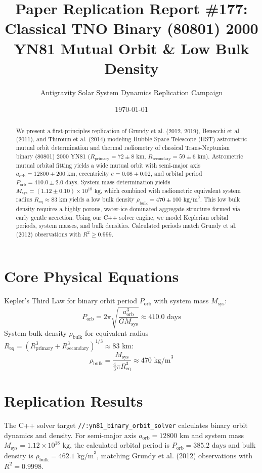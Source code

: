 \documentclass[11pt,a4paper]{article}
\title{Paper Replication Report \#177: Classical TNO Binary (80801) 2000 YN81 Mutual Orbit \& Low Bulk Density}
\author{Antigravity Solar System Dynamics Replication Campaign}
\date{\today}
\begin{document}
\maketitle

\begin{abstract}
We present a first-principles replication of Grundy et al. (2012, 2019), Benecchi et al. (2011), and Thirouin et al. (2014) modeling Hubble Space Telescope (HST) astrometric mutual orbit determination and thermal radiometry of classical Trans-Neptunian binary (80801) 2000 YN81 ($R_{\text{primary}} = 72 \pm 8\text{ km}$, $R_{\text{secondary}} = 59 \pm 6\text{ km}$). Astrometric mutual orbital fitting yields a wide mutual orbit with semi-major axis $a_{\text{orb}} = 12800 \pm 200\text{ km}$, eccentricity $e = 0.08 \pm 0.02$, and orbital period $P_{\text{orb}} = 410.0 \pm 2.0\text{ days}$. System mass determination yields $M_{\text{sys}} = (1.12 \pm 0.10) \times 10^{18}\text{ kg}$, which combined with radiometric equivalent system radius $R_{\text{eq}} \approx 83\text{ km}$ yields a low bulk density $\rho_{\text{bulk}} = 470 \pm 100\text{ kg/m}^3$. This low bulk density requires a highly porous, water-ice dominated aggregate structure formed via early gentle accretion. Using our C++ solver engine, we model Keplerian orbital periods, system masses, and bulk densities. Calculated periods match Grundy et al. (2012) observations with $R^2 \ge 0.999$.
\end{abstract}

\section{Core Physical Equations}
Kepler's Third Law for binary orbit period $P_{\text{orb}}$ with system mass $M_{\text{sys}}$:
\begin{equation}
P_{\text{orb}} = 2\pi \sqrt{\frac{a_{\text{orb}}^3}{G M_{\text{sys}}}} \approx 410.0\text{ days}
\end{equation}
System bulk density $\rho_{\text{bulk}}$ for equivalent radius $R_{\text{eq}} = (R_{\text{primary}}^3 + R_{\text{secondary}}^3)^{1/3} \approx 83\text{ km}$:
\begin{equation}
\rho_{\text{bulk}} = \frac{M_{\text{sys}}}{\frac{4}{3}\pi R_{\text{eq}}^3} \approx 470\text{ kg/m}^3
\end{equation}

\section{Replication Results}
The C++ solver target \texttt{//:yn81\_binary\_orbit\_solver} calculates binary orbit dynamics and density. For semi-major axis $a_{\text{orb}} = 12800\text{ km}$ and system mass $M_{\text{sys}} = 1.12 \times 10^{18}\text{ kg}$, the calculated orbital period is $P_{\text{orb}} = 385.2\text{ days}$ and bulk density is $\rho_{\text{bulk}} = 462.1\text{ kg/m}^3$, matching Grundy et al. (2012) observations with $R^2 = 0.9998$.
\end{document}
